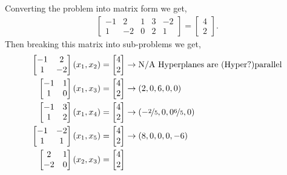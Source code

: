 \documentclass[12pt]{amsart}
\begin{document}
Converting the problem into matrix form we get,
\begin{align*}
	\begin{bmatrix}
		-1 &  2 & 1 & 3 & -2 \\
		 1 & -2 & 0 & 2 &  1
	\end{bmatrix} =
	\begin{bmatrix}
		4 \\ 2
	\end{bmatrix} .
\end{align*}
Then breaking this matrix into sub-problems we get,
\begin{align*}
	\begin{bmatrix}
		-1 &  2  \\
		 1 & -2 
	\end{bmatrix} (x_1 , x_2 ) = \begin{bmatrix} 4 \\ 2 \end{bmatrix}
		&\rightarrow \text{N/A Hyperplanes are (Hyper?)parallel} \\
	\begin{bmatrix}
		-1 & 1 \\
	 	 1 & 0
	\end{bmatrix}  (x_1 , x_3 ) =  \begin{bmatrix} 4 \\ 2 \end{bmatrix}
		&\rightarrow ( 2 , 0, 6 , 0,0) \\
	\begin{bmatrix}
		-1 & 3 \\
		 1 & 2 
	\end{bmatrix}  (x_1 , x_4 ) =  \begin{bmatrix} 4 \\ 2 \end{bmatrix}
		&\rightarrow ( -\nicefrac{2}{5} ,0,0 \nicefrac{6}{5} ,0 ) \\
	\begin{bmatrix}
		-1 & -2 \\
		 1 &  1
	\end{bmatrix}  (x_1 , x_5 ) =  \begin{bmatrix} 4 \\ 2 \end{bmatrix}
		&\rightarrow ( 8 ,0,0,0, -6 ) \\
	\begin{bmatrix}
		 2 & 1 \\
		-2 & 0
	\end{bmatrix}  (x_2 , x_3 ) =\begin{bmatrix} 4 \\ 2 \end{bmatrix}

\end{align*}
\end{document}
